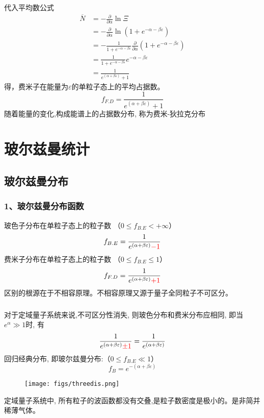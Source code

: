 \begin{frame}
  \frametitle{}
代入平均数公式
\[
\begin{aligned}
\overline{N} &= - \frac{\partial }{\partial \alpha } \ln \Xi \\
&= - \frac{\partial }{\partial \alpha } \ln (1+ e^{-\alpha -\beta \varepsilon }) \\
&= - \frac{1}{1+ e^{-\alpha -\beta \varepsilon }}\frac{\partial }{\partial \alpha } (1+ e^{-\alpha -\beta \varepsilon }) \\
&= \frac{1}{1+ e^{-\alpha -\beta \varepsilon }}e^{-\alpha -\beta \varepsilon } \\
&= \frac{1}{e^{(\alpha +\beta \varepsilon)}+1}
\end{aligned} 
  \]
得，费米子在能量为$\varepsilon$的单粒子态上的平均占据数。
\[ \boxed{f_{F.D} =  \frac{1}{e^{(\alpha +\beta \varepsilon)}+1}}\]
随着能量的变化,构成能谱上的占据数分布, 称为费米-狄拉克分布
\end{frame} 

\section{玻尔兹曼统计 }

\subsection{玻尔兹曼分布}
\begin{frame}
  \frametitle{ 1、玻尔兹曼分布函数}
  玻色子分布在单粒子态上的粒子数 （$0 \le f_{B.E} < +\infty $）
  \[f_{B.E} =  \frac{1}{e^{(\alpha +\beta \varepsilon)}{\color{red} -1}}\]
  费米子分布在单粒子态上的粒子数 （$0 \le f_{B.E} \le 1 $）
  \[f_{F.D} =  \frac{1}{e^{(\alpha +\beta \varepsilon)}{\color{red} +1}}\]
  区别的根源在于不相容原理。不相容原理又源于量子全同粒子不可区分。
\end{frame} 

\begin{frame}
  \frametitle{}
  \begin{minipage}[b]{0.49\textwidth}
   对于定域量子系统来说,不可区分性消失, 则玻色分布和费米分布应相同, 即当 $e^\alpha \gg  1$时, 有
  \[\frac{1}{e^{(\alpha +\beta \varepsilon)}{\color{red} \pm 1}} = \frac{1}{e^{(\alpha +\beta \varepsilon)}}\]
  回归经典分布, 即玻尔兹曼分布:（$0 \le f_{B.E} \ll  1 $）
  \[\boxed{f_{B} = e^{-(\alpha +\beta \varepsilon)}}\]
  \end{minipage}
\begin{minipage}[b]{0.49\textwidth}
\begin{figure}[htbp]
  \centering
  \texttt{[image: figs/threedis.png]}
\end{figure}
\end{minipage}
定域量子系统中, 所有粒子的波函数都没有交叠,是粒子数密度是极小的。是非简并稀薄气体。 
\end{frame} 

